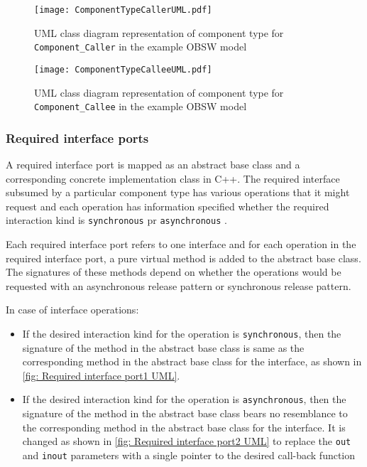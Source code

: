 \begin{figure}[h]
	\centering
	\texttt{[image: ComponentTypeCallerUML.pdf]}
	\caption{UML class diagram representation of component type for \texttt{Component\allowbreak\_Caller} in the example OBSW model}
	\label{fig: Component type Caller UML}
\end{figure} 

\begin{figure}[h]
	\centering
	\texttt{[image: ComponentTypeCalleeUML.pdf]}
	\caption{UML class diagram representation of component type for \texttt{Component\allowbreak\_Callee} in the example OBSW model}
	\label{fig: Component type Callee UML}
\end{figure} 

\subsubsection{\textbf{Required interface ports}}
A required interface port is mapped as an abstract base class and a corresponding concrete implementation class in C++. The required interface subsumed by a particular component type has various operations that it might request and each operation has information specified whether the required interaction kind is \texttt{synchronous} pr \texttt{asynchronous} \cite{SpecMetamodel,CompBasedProcess}. 

Each required interface port refers to one interface and for each operation in the required interface port, a pure virtual method is added to the abstract base class. The signatures of these methods depend on whether the operations would be requested with an asynchronous release pattern or synchronous release pattern.

In case of interface operations:
\begin{itemize}
\item If the desired interaction kind for the operation is \texttt{synchronous}, then the signature of the method in the abstract base class is same as the corresponding method in the abstract base class for the interface, as shown in \cref{fig: Required interface port1 UML}.
\item If the desired interaction kind for the operation is \texttt{asynchronous}, then the signature of the method in the abstract base class bears no resemblance to the corresponding method in the abstract base class for the interface. It is changed as shown in \cref{fig: Required interface port2 UML} to replace the \texttt{out} and \texttt{inout} parameters with a single pointer to the desired call-back function 
\end{itemize}

